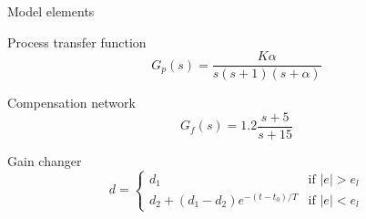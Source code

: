 \documentclass{beamer}
\begin{document}
\begin{frame}{Model elements} %

\begin{block}{Process transfer function}
\[
    G_p(s) = \frac{K\alpha}{s(s + 1)(s + \alpha)}
\]
\end{block}

\begin{block}{Compensation network}
\[
    G_f(s) = 1.2\frac{s + 5}{s + 15}
\]
\end{block}

\begin{block}{Gain changer}
\begin{equation*}
  d = \begin{cases}
    d_1                              & \mbox{if }\lvert e\rvert > e_l\\
    d_2 + (d_1 - d_2)e^{-(t-t_0)/T}  & \mbox{if }\lvert e\rvert < e_l
\end{cases}
\end{equation*}
\end{block}

\end{frame}
\end{document}
